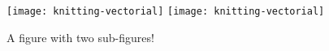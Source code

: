 % 
% 
% 
% 



\lipsum[1-3]

\begin{figure}[htbp]
  \centering
    {\texttt{[image: knitting-vectorial]}}%
    {\texttt{[image: knitting-vectorial]}}%
  \caption{A figure with two sub-figures!}
  \label{fig:fig2subfig}
\end{figure}

